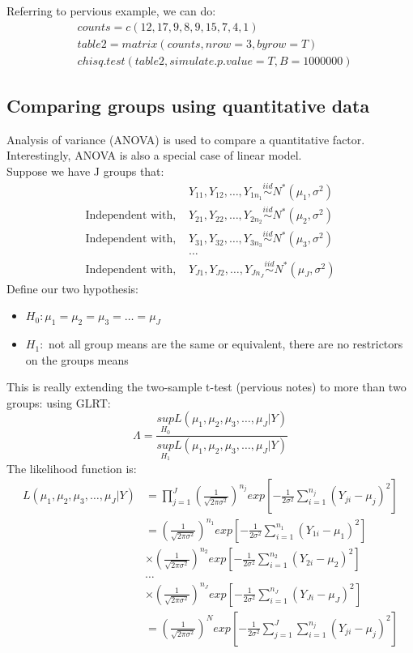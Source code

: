 \documentclass[12pt ]{article}
\begin{document}
Referring to pervious example, we can do:
\begin{align*}
&counts = c(12,17,9,8,9,15,7,4,1) \\
&table2 = matrix(counts,nrow=3,byrow=T) \\
&chisq.test(table2, simulate.p.value = T, B=1000000)
\end{align*}

\subsection{Comparing groups using quantitative data}
Analysis of variance (ANOVA) is used to compare a quantitative factor. Interestingly, ANOVA is also a special case of linear model. \\

Suppose we have J groups that:
\begin{align*}
&Y_{11}, Y_{12}, \ldots, Y_{1n_{1}} \overset{iid}{\sim} N^{*}(\mu_{1}, \sigma^2) \\ 
\text{Independent with, } & Y_{21}, Y_{22}, \ldots, Y_{2n_{2}} \overset{iid}{\sim} N^{*}(\mu_{2}, \sigma^2) \\ 
\text{Independent with, } & Y_{31}, Y_{32}, \ldots, Y_{3n_{3}} \overset{iid}{\sim} N^{*}(\mu_{3}, \sigma^2) \\
&\dots \\
\text{Independent with, } & Y_{J1}, Y_{J2}, \ldots, Y_{Jn_{J}} \overset{iid}{\sim} N^{*}(\mu_{J}, \sigma^2)
\end{align*}
Define our two hypothesis:
\begin{itemize}
\item $H_{0}: \mu_{1} = \mu_{2} = \mu_{3} = \ldots = \mu_{J}$
\item $H_{1}: $ not all group means are the same or equivalent, there are no restrictors on the groups means
\end{itemize}
This is really extending the two-sample t-test (pervious notes) to more than two groups: using GLRT: 
\begin{equation*}
\Lambda = \frac{\underset{H_{0}}{sup} L( \mu_{1}, \mu_{2}, \mu_{3}, \ldots , \mu_{J}| Y)}{\underset{H_{1}}{sup} L( \mu_{1}, \mu_{2}, \mu_{3}, \ldots , \mu_{J}| Y)}
\end{equation*}
The likelihood function is:
\begin{align*}
L( \mu_{1}, \mu_{2}, \mu_{3}, \ldots , \mu_{J}| Y) &= \prod_{j=1}^{J}  (\frac{1}{\sqrt{2 \pi \sigma^2}})^{n_{j}} exp[ - \frac{1}{2 \sigma^2} \sum^{n_{j}}_{i=1} (Y_{ji} - \mu_{j})^2] \\
&= (\frac{1}{\sqrt{2 \pi \sigma^2}})^{n_{1}} exp[ - \frac{1}{2 \sigma^2} \sum^{n_{1}}_{i=1} (Y_{1i} - \mu_{1})^2] \\
& \times (\frac{1}{\sqrt{2 \pi \sigma^2}})^{n_{2}} exp[ - \frac{1}{2 \sigma^2} \sum^{n_{2}}_{i=1} (Y_{2i} - \mu_{2})^2] \\
& \ldots \\
& \times (\frac{1}{\sqrt{2 \pi \sigma^2}})^{n_{J}} exp[ - \frac{1}{2 \sigma^2} \sum^{n_{J}}_{i=1} (Y_{Ji} - \mu_{J})^2] \\
&=  (\frac{1}{\sqrt{2 \pi \sigma^2}})^{N} exp[ - \frac{1}{2 \sigma^2} \sum_{j=1}^{J}\sum^{n_{j}}_{i=1} (Y_{ji} - \mu_{j})^2]
\end{align*}
\end{document}
